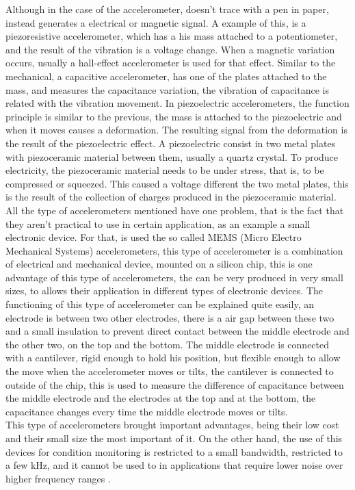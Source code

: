 Although in the case of the accelerometer, doesn't trace with a pen in paper, instead generates a electrical or magnetic signal. A example of this, is a piezoresistive accelerometer, which has a his mass attached to a potentiometer, and the result of the vibration is a voltage change. When a magnetic variation occurs, usually a hall-effect accelerometer is used for that effect.  
Similar to the mechanical, a capacitive accelerometer, has one of the plates attached to the mass, and measures the capacitance variation, the vibration of capacitance is related with the vibration movement. 
In piezoelectric accelerometers, the function principle is similar to the previous, the mass is attached to the piezoelectric and when it moves causes a deformation. The resulting signal from the deformation is the result of the piezoelectric effect. A piezoelectric consist in two metal plates with piezoceramic material between them, usually a quartz crystal. To produce electricity, the piezoceramic material needs to be under stress, that is, to be compressed or squeezed. This caused a voltage different the two metal plates, this is the result of the collection of charges produced in the piezoceramic material.
All the type of accelerometers mentioned have one problem, that is the fact that they aren't practical to use in certain application, as an example a small electronic device. For that, is used the so called MEMS (Micro Electro Mechanical Systems) accelerometers, this type of accelerometer is a combination of electrical and mechanical device, mounted on a silicon chip, this is one advantage of this type of accelerometers, the can be very produced in very small sizes, to allows their application in different types of electronic devices. The functioning of this type of accelerometer can be explained quite easily, an electrode is between two other electrodes, there is a air gap between these two and a small insulation to prevent direct contact between the middle electrode and the other two, on the top and the bottom. The middle electrode is connected with a cantilever, rigid enough to hold his position, but flexible enough to allow the move when the accelerometer moves or tilts, the cantilever is connected to outside of the chip, this is used to measure the difference of capacitance between the middle electrode and the electrodes at the top and at the bottom, the capacitance changes every time the middle electrode moves or tilts.\\

This type of accelerometers brought important advantages, being their low cost and their small size the most important of it. On the other hand, the use of this devices for condition monitoring is restricted to a small bandwidth, restricted to a few kHz, and it cannot be used to in applications that require lower noise over higher frequency ranges \cite{WhatYouNeed}\cite{HowAccelerometersWork2009}.

\clearpage
\printbibliography[heading=subbibliography]
